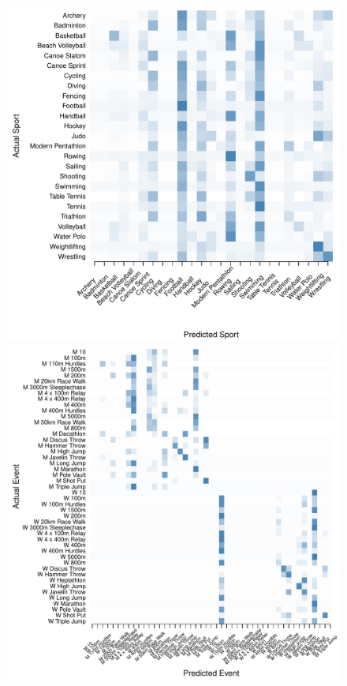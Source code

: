 \begin{figure}
\begin{center}
\begin{minipage}{0.20\textwidth}
\begin{center}
      \includegraphics[scale=0.20]{../graphics/sportCIT-tst.pdf}
    \end{center}
  \end{minipage}
  \hspace{0.05\textwidth}
    \begin{minipage}{0.20\textwidth}
    \begin{center}
      \includegraphics[scale=0.20]{../graphics/athletesCIT-trn.pdf}

\end{center}
\end{minipage}
\end{center}
\end{figure}
